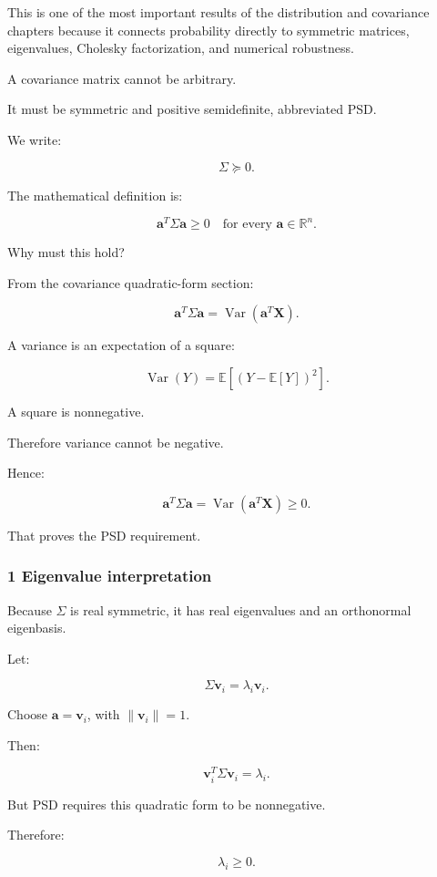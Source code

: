 This is one of the most important results of the distribution and covariance chapters because it connects probability directly to symmetric matrices, eigenvalues, Cholesky factorization, and numerical robustness.

A covariance matrix cannot be arbitrary.

It must be symmetric and positive semidefinite, abbreviated PSD.

We write:

\[
 \boxed{\Sigma\succeq0}.
\]

The mathematical definition is:

\[
 \boxed{ \mathbf a^T\Sigma\mathbf a\ge0 \quad\text{for every }\mathbf a\in\mathbb R^n }.
\]

Why must this hold?

From the covariance quadratic-form section:

\[
 \mathbf a^T\Sigma\mathbf a = \operatorname{Var}(\mathbf a^T\mathbf X).
\]

A variance is an expectation of a square:

\[
 \operatorname{Var}(Y) = \mathbb E[(Y-\mathbb E[Y])^2].
\]

A square is nonnegative.

Therefore variance cannot be negative.

Hence:

\[
 \boxed{ \mathbf a^T\Sigma\mathbf a = \operatorname{Var}(\mathbf a^T\mathbf X) \ge0 }.
\]

That proves the PSD requirement.

\subsubsection{1 Eigenvalue interpretation}\label{02-foundations-ii-ch024-eigenvalue-interpretation}

Because \(\Sigma\) is real symmetric, it has real eigenvalues and an orthonormal eigenbasis.

Let:

\[
 \Sigma\mathbf v_i=\lambda_i\mathbf v_i.
\]

Choose \(\mathbf a=\mathbf v_i\), with \(\|\mathbf v_i\|=1\).

Then:

\[
 \mathbf v_i^T\Sigma\mathbf v_i = \lambda_i.
\]

But PSD requires this quadratic form to be nonnegative.

Therefore:

\[
 \boxed{\lambda_i\ge0}.
\]

